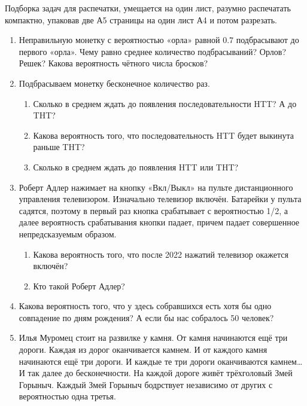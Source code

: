 \documentclass[12pt]{article}
\theoremstyle{definition}
\begin{document}
Подборка задач для распечатки, умещается на один лист, разумно распечатать компактно, 
упаковав две А5 страницы на один лист А4 и потом разрезать.

\begin{enumerate}
  \item  Неправильную монетку с вероятностью «орла» равной $0.7$ подбрасывают до первого «орла».
  Чему равно среднее количество подбрасываний?  Орлов? Решек? Какова вероятность чётного числа бросков? 

  \item Подбрасываем монетку бесконечное количество раз. 
  \begin{enumerate}
    \item Сколько в среднем ждать до появления последовательности HTT? А до THT? 
    \item Какова вероятность того, что последовательность HTT будет выкинута раньше THT?
    \item Сколько в среднем ждать до появления HTT или THT?
  \end{enumerate}
    

  \item Роберт Адлер нажимает на кнопку «Вкл/Выкл» на пульте дистанционного
управления телевизором. Изначально телевизор включён. Батарейки
у пульта садятся, поэтому в первый раз кнопка срабатывает с вероятностью
1/2, а далее вероятность срабатывания кнопки падает, причем падает совершенное непредсказуемым образом. 

\begin{enumerate}
  \item Какова вероятность того, что после 2022 нажатий телевизор окажется включён?
  \item Кто такой Роберт Адлер?
\end{enumerate}

\item Какова вероятность того, что у здесь собравшихся есть хотя бы одно совпадение по дням рождения?
А если бы нас собралось 50 человек?

\item Илья Муромец стоит на развилке у камня. От камня начинаются
ещё три дороги. Каждая из дорог оканчивается камнем.
И от каждого камня начинаются ещё три дороги. И каждые те три
дороги оканчиваются камнем\ldots И так далее до бесконечности. На
каждой дороге живёт трёхголовый Змей Горыныч. Каждый Змей
Горыныч бодрствует независимо от других с вероятностью одна третья. 


\end{enumerate}
\end{document}

